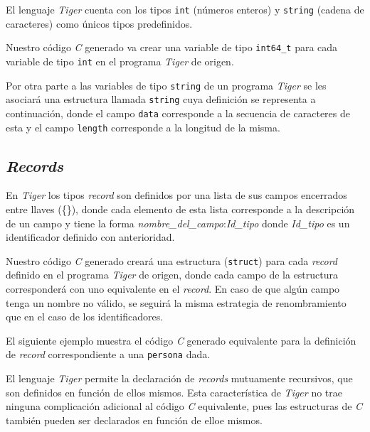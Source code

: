 \documentclass{article}
\begin{document}
El lenguaje \textit{Tiger} cuenta con los tipos \texttt{int} (números enteros)
y \texttt{string} (cadena de caracteres) como únicos tipos predefinidos.

Nuestro código \textit{C} generado va crear una variable de tipo
\texttt{int64\_t} para cada variable de tipo \texttt{int} en el programa
\textit{Tiger} de origen.

Por otra parte a las variables de tipo \texttt{string} de un programa
\textit{Tiger} se les asociará una estructura llamada \texttt{string} cuya
definición se representa a continuación, donde el campo \texttt{data}
corresponde a la secuencia de caracteres de esta y el campo \texttt{length}
corresponde a la longitud de la misma.

\begin{quote}

\end{quote}

\subsection{\emph{Records}}

En \textit{Tiger} los tipos \textit{record} son definidos por una lista de sus
campos encerrados entre llaves (\{\}), donde cada elemento de esta lista
corresponde a la descripción de un campo y tiene la forma 
\textit{nombre\_del\_campo}:\textit{Id\_tipo} donde \textit{Id\_tipo} es un
identificador definido con anterioridad.

Nuestro código \textit{C} generado creará una estructura (\texttt{struct}) para
cada \textit{record} definido en el programa \textit{Tiger} de origen, donde
cada campo de la estructura corresponderá con uno equivalente en el
\textit{record}. En caso de que algún campo tenga un nombre no válido, se
seguirá la misma estrategia de renombramiento que en el caso de los
identificadores.

El siguiente ejemplo muestra el código \textit{C} generado equivalente para la
definición de \textit{record} correspondiente a una \texttt{persona} dada. 

\begin{quote}

\end{quote}

\begin{quote}

\end{quote}

El lenguaje \textit{Tiger} permite la declaración de \textit{records}
mutuamente recursivos, que son definidos en función de ellos mismos. Esta
característica de \textit{Tiger} no trae ninguna complicación adicional al
código \textit{C} equivalente, pues las estructuras de \textit{C} también
pueden ser declarados en función de elloe mismos. 
\end{document}
